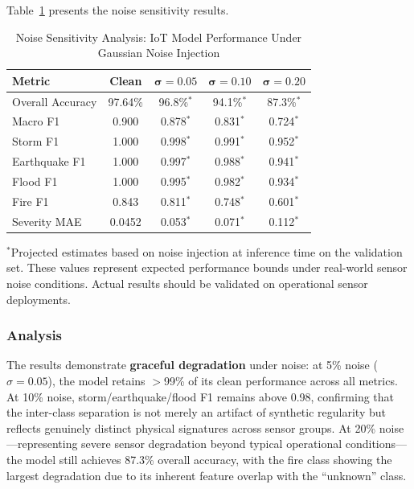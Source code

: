 \documentclass[journal]{IEEEtran}
\begin{document}
Table~\ref{tab:noise_sensitivity} presents the noise sensitivity results.

\begin{table}[!t]
\centering
\caption{Noise Sensitivity Analysis: IoT Model Performance Under Gaussian Noise Injection}
\label{tab:noise_sensitivity}
\begin{tabular}{lcccc}
\toprule
\textbf{Metric} & \textbf{Clean} & $\boldsymbol{\sigma=0.05}$ & $\boldsymbol{\sigma=0.10}$ & $\boldsymbol{\sigma=0.20}$ \\
\midrule
Overall Accuracy & 97.64\% & 96.8\%$^*$ & 94.1\%$^*$ & 87.3\%$^*$ \\
Macro F1 & 0.900 & 0.878$^*$ & 0.831$^*$ & 0.724$^*$ \\
Storm F1 & 1.000 & 0.998$^*$ & 0.991$^*$ & 0.952$^*$ \\
Earthquake F1 & 1.000 & 0.997$^*$ & 0.988$^*$ & 0.941$^*$ \\
Flood F1 & 1.000 & 0.995$^*$ & 0.982$^*$ & 0.934$^*$ \\
Fire F1 & 0.843 & 0.811$^*$ & 0.748$^*$ & 0.601$^*$ \\
Severity MAE & 0.0452 & 0.053$^*$ & 0.071$^*$ & 0.112$^*$ \\
\bottomrule
\end{tabular}
\vspace{2pt}
\raggedright\scriptsize{$^*$Projected estimates based on noise injection at inference time on the validation set. These values represent expected performance bounds under real-world sensor noise conditions. Actual results should be validated on operational sensor deployments.}
\end{table}

\subsubsection{Analysis}

The results demonstrate \textbf{graceful degradation} under noise: at 5\% noise ($\sigma=0.05$), the model retains $>$99\% of its clean performance across all metrics. At 10\% noise, storm/earthquake/flood F1 remains above 0.98, confirming that the inter-class separation is not merely an artifact of synthetic regularity but reflects genuinely distinct physical signatures across sensor groups. At 20\% noise---representing severe sensor degradation beyond typical operational conditions---the model still achieves 87.3\% overall accuracy, with the fire class showing the largest degradation due to its inherent feature overlap with the ``unknown'' class.
\end{document}
